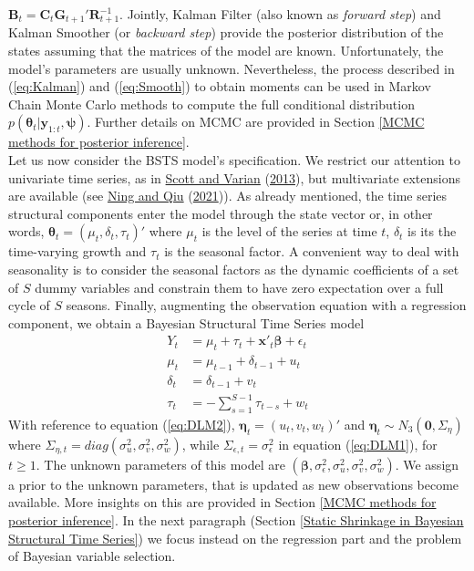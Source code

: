 \documentclass[
  12pt,
]{book}
\theoremstyle{break}
\theoremstyle{nonumberplain}
\begin{document}
\(\boldsymbol{B}_{t}=\boldsymbol{C}_{t}\boldsymbol{G}_{t+1}'\boldsymbol{R}_{t+1}^{-1}\).
Jointly, Kalman Filter (also known as \emph{forward step}) and Kalman
Smoother (or \emph{backward step}) provide the posterior distribution of
the states assuming that the matrices of the model are known.
Unfortunately, the model's parameters are usually unknown. Nevertheless,
the process described in (\ref{eq:Kalman}) and (\ref{eq:Smooth}) to
obtain moments can be used in Markov Chain Monte Carlo methods to
compute the full conditional distribution
\(p(\boldsymbol{\theta}_{t}|\boldsymbol{y}_{1:t},\boldsymbol{\psi})\).
Further details on MCMC are provided in Section
\ref{MCMC methods for posterior inference}.\\
Let us now consider the BSTS model's specification. We restrict our
attention to univariate time series, as in
\protect\hyperlink{ref-scott_varian_2013}{Scott and Varian}
(\protect\hyperlink{ref-scott_varian_2013}{2013}), but multivariate
extensions are available (see \protect\hyperlink{ref-ning2021mbsts}{Ning
and Qiu} (\protect\hyperlink{ref-ning2021mbsts}{2021})). As already
mentioned, the time series structural components enter the model through
the state vector or, in other words,
\(\boldsymbol{\theta}_{t}=(\mu_{t},\delta_{t},\tau_{t})'\) where
\(\mu_{t}\) is the level of the series at time \(t\), \(\delta_{t}\) is
its the time-varying growth and \(\tau_{t}\) is the seasonal factor. A
convenient way to deal with seasonality is to consider the seasonal
factors as the dynamic coefficients of a set of \(S\) dummy variables
and constrain them to have zero expectation over a full cycle of \(S\)
seasons. Finally, augmenting the observation equation with a regression
component, we obtain a Bayesian Structural Time Series model
\begin{align} \label{eq:eqbsts}
  Y_{t} & =\mu_{t}+\tau_{t}+\boldsymbol{x}'_{t}\boldsymbol{\beta}+\epsilon_{t}\\
  \mu_{t} & = \mu_{t-1}+\delta_{t-1}+u_{t} \nonumber \\
  \delta_{t} & = \delta_{t-1}+v_{t} \nonumber \\
  \tau_{t} & =-\sum_{s=1}^{S-1}\tau_{t-s}+w_{t} \nonumber
  \end{align} With reference to equation (\ref{eq:DLM2}),
\(\boldsymbol{\eta}_{t}=(u_{t},v_{t},w_{t})'\) and
\(\boldsymbol{\eta}_{t} \sim N_{3}(\boldsymbol{0},\Sigma_{\eta})\) where
\(\Sigma_{\eta,t}=diag(\sigma^{2}_{u},\sigma^{2}_{v},\sigma^{2}_{w})\),
while \(\Sigma_{\epsilon,t}=\sigma^{2}_{\epsilon}\) in equation
(\ref{eq:DLM1}), for \(t \geq 1\). The unknown parameters of this model
are
\((\boldsymbol{\beta},\sigma^{2}_{\epsilon},\sigma^{2}_{u},\sigma^{2}_{v},\sigma^{2}_{w})\).
We assign a prior to the unknown parameters, that is updated as new
observations become available. More insights on this are provided in
Section \ref{MCMC methods for posterior inference}. In the next
paragraph (Section
\ref{Static Shrinkage in Bayesian Structural Time Series}) we focus
instead on the regression part and the problem of Bayesian variable
selection.
\end{document}

